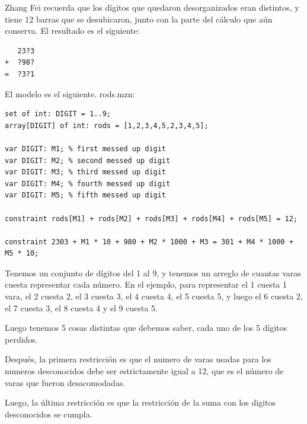 \documentclass[12pt]{article}
\begin{document}
\begin{justify}
Zhang Fei recuerda que los dígitos que quedaron desorganizados eran distintos, y tiene 12 barras que se desubicaron, junto con la parte del cálculo que aún conserva. El resultado es el siguiente:
\end{justify}

\begin{Verbatim}
   23?3
+  ?98?
=  ?3?1
\end{Verbatim}

\begin{justify}
El modelo es el siguiente. rods.mzn:
\end{justify}

\begin{Verbatim}
set of int: DIGIT = 1..9;
array[DIGIT] of int: rods = [1,2,3,4,5,2,3,4,5];

var DIGIT: M1; % first messed up digit
var DIGIT: M2; % second messed up digit
var DIGIT: M3; % third messed up digit
var DIGIT: M4; % fourth messed up digit
var DIGIT: M5; % fifth messed up digit

constraint rods[M1] + rods[M2] + rods[M3] + rods[M4] + rods[M5] = 12;

constraint 2303 + M1 * 10 + 980 + M2 * 1000 + M3 = 301 + M4 * 1000 + M5 * 10;
\end{Verbatim}

\begin{justify}
Tenemos un conjunto de dígitos del 1 al 9, y tenemos un arreglo de cuantas varas cuesta representar cada número. En el ejemplo, para representar el 1 cuesta 1 vara, el 2 cuesta 2, el 3 cuesta 3, el 4 cuesta 4, el 5 cuesta 5, y luego el 6 cuesta 2, el 7 cuesta 3, el 8 cuesta 4 y el 9 cuesta 5.
\end{justify}

\begin{justify}
Luego tenemos 5 cosas distintas que debemos saber, cada uno de los 5 dígitos perdidos. 
\end{justify}

\begin{justify}
Después, la primera restricción es que el numero de varas usadas para los numeros desconocidos debe ser estrictamente igual a 12, que es el número de varas que fueron desacomodadas.
\end{justify}

\begin{justify}
Luego, la última restricción es que la restricción de la suma con los digitos desconocidos se cumpla.
\end{justify}
\end{document}
